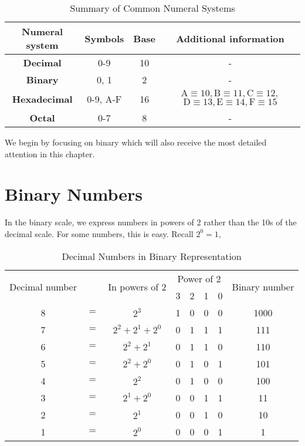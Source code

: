 \begin{table}[ht]
\centering
\renewcommand{\arraystretch}{1.4}
\begin{tabular}{|c|c|c|c|}
\hline
\textbf{Numeral system} & \textbf{Symbols} & \textbf{Base} & \textbf{Additional information} \\ \hline
\textbf{Decimal} & 0-9 & 10 & - \\ \hline
\textbf{Binary} & 0, 1 & 2 & - \\ \hline
\textbf{Hexadecimal} & 0-9, A-F & 16 & $\mathrm{A} \equiv 10, \mathrm{B} \equiv 11, \mathrm{C} \equiv 12,$ $\mathrm{D} \equiv 13, \mathrm{E} \equiv 14, \mathrm{F} \equiv 15$ \\ \hline
\textbf{Octal} & 0-7 & 8 & - \\ \hline
\end{tabular}
\caption{Summary of Common Numeral Systems}
\label{tab:number_systems}
\end{table}

We begin by focusing on binary which will also receive the most detailed attention in this chapter.

\section{Binary Numbers}
In the binary scale, we express numbers in powers of 2 rather than the 10s of the decimal scale. For some numbers, this is easy. Recall $2^0=1$,

\begin{table}[!ht]
\centering
\renewcommand{\arraystretch}{1.4}
\begin{tabular}{|c c c c c c c c|}
\hline 
\multirow{2}{*}{Decimal number} & & \multirow{2}{*}{In powers of 2} & \multicolumn{4}{c}{Power of 2} & \multirow{2}{*}{Binary number} \\
& & & 3 & 2 & 1 & 0 & \\ \hline
8 & $=$ & $2^3$ & 1 & 0 & 0 & 0 & 1000 \\
7 & $=$ & $2^2 + 2^1 + 2^0$ & 0 & 1 & 1 & 1 & 111 \\
6 & $=$ & $2^2 + 2^1$ & 0 & 1 & 1 & 0 & 110 \\
5 & $=$ & $2^2 + 2^0$ & 0 & 1 & 0 & 1 & 101 \\
4 & $=$ & $2^2$ & 0 & 1 & 0 & 0 & 100 \\
3 & $=$ & $2^1 + 2^0$ & 0 & 0 & 1 & 1 & 11 \\
2 & $=$ & $2^1$ & 0 & 0 & 1 & 0 & 10 \\
1 & $=$ & $2^0$ & 0 & 0 & 0 & 1 & 1 \\ \hline
\end{tabular}
\caption{Decimal Numbers in Binary Representation}
\end{table}

